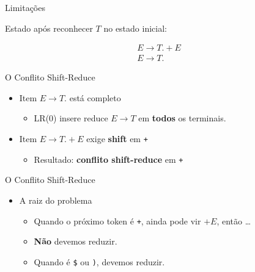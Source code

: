 \begin{frame}{Limitações}

    Estado após reconhecer \(T\) no estado inicial:

    \[\begin{array}{l}
    E \to T . + E \\
    E \to T .
\end{array}\]
\end{frame}

\begin{frame}[fragile]{O Conflito Shift-Reduce}

    \begin{itemize}

        \item
        Item \(E \to T .\) está completo

        \begin{itemize}

            \item
            LR(0) insere reduce \(E \to T\) em \textbf{todos} os terminais.
        \end{itemize}
        \item
        Item \(E \to T . + E\) exige \textbf{shift} em
        \texttt{+}

        \begin{itemize}

            \item
            Resultado: \textbf{conflito shift-reduce} em
            \texttt{+}
        \end{itemize}
    \end{itemize}
\end{frame}

\begin{frame}[fragile]{O Conflito Shift-Reduce}

    \begin{itemize}

        \item
        A raiz do problema

        \begin{itemize}

            \item
            Quando o próximo token é \texttt{+}, ainda pode vir
            \(+E\), então \ldots{}
            \item
            \textbf{Não} devemos reduzir.
            \item
            Quando é \verb|$| ou \texttt{)},
            devemos reduzir.
        \end{itemize}
    \end{itemize}
\end{frame}

